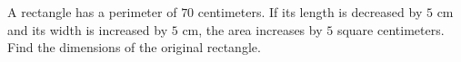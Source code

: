 A rectangle has a perimeter of $70$ centimeters. If its length is decreased by $5$ cm and its width is increased by $5$ cm, the area increases by $5$ square centimeters. Find the dimensions of the original rectangle.
